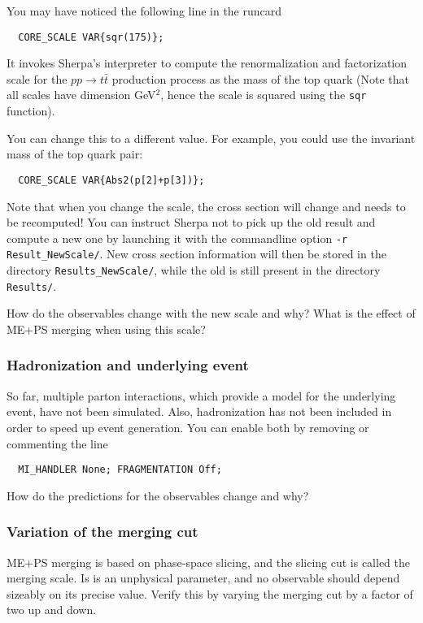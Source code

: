 \documentclass[10pt]{article}
\begin{document}
You may have noticed the following line in the runcard
\begin{verbatim}
  CORE_SCALE VAR{sqr(175)};
\end{verbatim}
It invokes Sherpa's interpreter to compute the renormalization and factorization
scale for the $pp\to t\bar{t}$ production process as the mass of the top quark
(Note that all scales have dimension GeV$^2$, hence the scale is squared using
the {\tt sqr} function).

You can change this to a different value. For example, you could use
the invariant mass of the top quark pair:
\begin{verbatim}
  CORE_SCALE VAR{Abs2(p[2]+p[3])};
\end{verbatim}
Note that when you change the scale, the cross section will change and needs to be recomputed!
You can instruct Sherpa not to pick up the old result and compute a new one by launching 
it with the commandline option {\tt -r Result\_NewScale/}. New cross section information
will then be stored in the directory {\tt Results\_NewScale/}, while the old is still present
in the directory {\tt Results/}.

How do the observables change with the new scale and why?
What is the effect of ME+PS merging when using this scale?

\subsubsection{Hadronization and underlying event}

So far, multiple parton interactions, which provide a model for the underlying event,
have not been simulated. Also, hadronization has not been included in order to speed up
event generation. You can enable both by removing or commenting the line
\begin{verbatim}
  MI_HANDLER None; FRAGMENTATION Off;
\end{verbatim}
How do the predictions for the observables change and why?

\subsubsection{Variation of the merging cut}

ME+PS merging is based on phase-space slicing, and the slicing cut is called 
the merging scale. Is is an unphysical parameter, and no observable should
depend sizeably on its precise value. Verify this by varying the merging
cut by a factor of two up and down.
\end{document}
